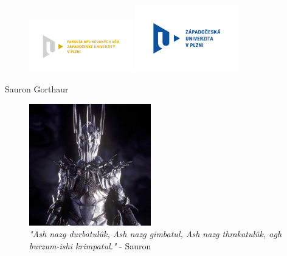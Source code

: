 \documentclass[12pt]{article} %
\begin{document}

\begin{figure}[h!] %
\centering %
\includegraphics[width=0.4\textwidth]{pic/FAV_cmyk.png} %
\hspace{2cm}  %
\includegraphics[width=0.4\textwidth]{pic/ZCU_cmyk.png} %
\end{figure}

\begin{center} %
\LARGE{Sauron Gorthaur}\\ %
\vspace{.5cm} %
\end{center}

\begin{figure}[h!]
    \centering
    \includegraphics{pic/sauron-foto.jpg}  
    \caption{\textit{"Ash nazg durbatulûk, Ash nazg gimbatul, Ash nazg thrakatulûk, agh burzum-ishi krimpatul."} - Sauron}
\end{figure}
\end{document}
